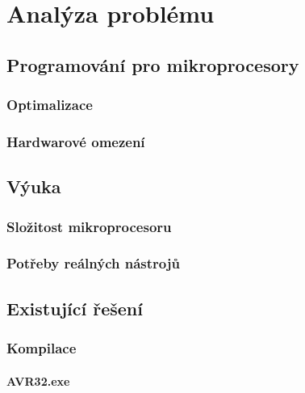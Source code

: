 \chapter{Analýza problému}

\blind[1]

\section{Programování pro mikroprocesory}

\blind[1]

\subsection{Optimalizace}

\blind[1]

\subsection{Hardwarové omezení}

\blind[1]

\section{Výuka}

\blind[2]

\subsection{Složitost mikroprocesoru}

\blind[2]

\subsection{Potřeby reálných nástrojů}

\blind[1]

\section{Existující řešení}

\subsection{Kompilace}

\subsubsection{AVR32.exe}

